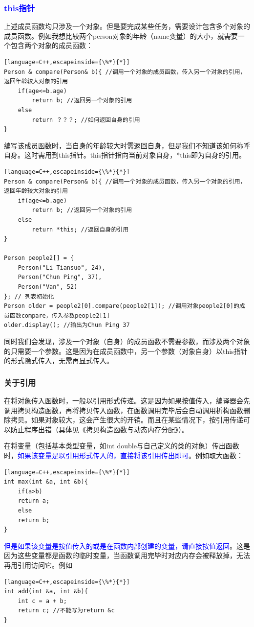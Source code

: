 \documentclass[UTF8]{ctexart}
\begin{document}
\subsubsection{\textcolor{blue}{this指针}}
上述成员函数均只涉及一个对象。但是要完成某些任务，需要设计包含多个对象的成员函数。例如我想比较两个person对象的年龄（name变量）的大小，就需要一个包含两个对象的成员函数：
\begin{lstlisting}[language=C++,escapeinside={\%*}{*}]
Person & compare(Person& b){ //调用一个对象的成员函数，传入另一个对象的引用，返回年龄较大对象的引用
	if(age<=b.age)
		return b; //返回另一个对象的引用
	else 
		return ？？？; //如何返回自身的引用
}
\end{lstlisting}
编写该成员函数时，当自身的年龄较大时需返回自身，但是我们不知道该如何称呼自身。这时需用到this指针。this指针指向当前对象自身，*this即为自身的引用。
\begin{lstlisting}[language=C++,escapeinside={\%*}{*}]
Person & compare(Person& b){ //调用一个对象的成员函数，传入另一个对象的引用，返回年龄较大对象的引用
	if(age<=b.age)
		return b; //返回另一个对象的引用
	else 
		return *this; //返回自身的引用
}

Person people2[] = {
	Person("Li Tiansuo", 24),
	Person("Chun Ping", 37),
	Person("Van", 52)
}; // 列表初始化
Person older = people2[0].compare(people2[1]); //调用对象people2[0]的成员函数compare，传入参数people2[1]
older.display(); //输出为Chun Ping 37
\end{lstlisting}
同时我们会发现，涉及一个对象（自身）的成员函数不需要参数，而涉及两个对象的只需要一个参数。这是因为在成员函数中，另一个参数（对象自身）以this指针的形式隐式传入，无需再显式传入。
\subsubsection{关于引用}
在将对象传入函数时，一般以引用形式传递。这是因为如果按值传入，编译器会先调用拷贝构造函数，再将拷贝传入函数，在函数调用完毕后会自动调用析构函数删除拷贝。如果对象较大，这会产生很大的开销。而且在某些情况下，按引用传递可以防止程序出错（具体见《拷贝构造函数与动态内存分配》）。

在将变量（包括基本类型变量，如int double与自己定义的类的对象）传出函数时，\textcolor{blue}{如果该变量是以引用形式传入的，直接将该引用传出即可}。例如取大函数：
\begin{lstlisting}[language=C++,escapeinside={\%*}{*}]
int max(int &a, int &b){
	if(a>b)
	return a;
	else
	return b;
}
\end{lstlisting}
\textcolor{blue}{但是如果该变量是按值传入的或是在函数内部创建的变量，请直接按值返回}。这是因为这些变量都是函数的临时变量，当函数调用完毕时对应内存会被释放掉，无法再用引用访问它。例如
\begin{lstlisting}[language=C++,escapeinside={\%*}{*}]
int add(int &a, int &b){
	int c = a + b;
	return c; //不能写为return &c
}
\end{lstlisting}
\end{document}
